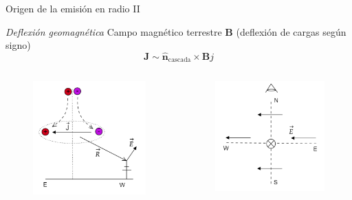 \documentclass{beamer}
\newcommand{\vect}[1]{\boldsymbol{\mathbf{#1}}}
\begin{document}
\begin{frame}{Origen de la emisión en radio II}

\begin{block}{\centering\textit{Deflexión geomagnética}}
	\centering Campo magnético terrestre $\vect{B}$ (deflexión de cargas según signo)
	$$\vect{J}\sim \hat{\vect{n}}_{\text{cascada}}\times\vect{B}j$$  
\end{block}

\begin{columns}
	
	\begin{figure}[H]
		\centering
		\includegraphics[width=.6\linewidth]{figures/Geomag_deflexion_1}
	\end{figure}
	\begin{figure}[H]
		\centering
		\includegraphics[width=.6\linewidth]{figures/Geomag_deflexion_2}
	\end{figure}
\end{columns}
\end{frame}
\end{document}
